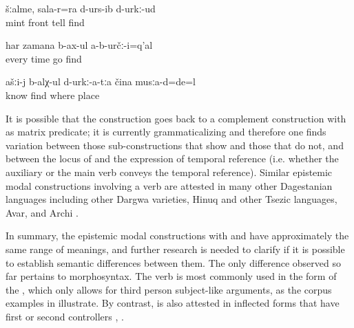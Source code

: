 \begin{exe}
	\ex	\label{ex:‎(It is made from) mint; I probably also told it (= how to make it) the last time}
	\gll	šːalme,	sala-r=ra	d-urs-ib	d-urkː-ud\\
		mint	front	tell	find\\
	\glt	{}
	
	\ex	\label{ex:‎‎Probably they did not always go (to drink milk)}
	\gll	har	zamana	b-ax-ul	a-b-určː-i=q'al\\
		every	time	go	find\\
	\glt	{}

	\ex	\label{ex:You should know / you probably know, where (in which place) they (the berries) were}
	\gll	ašːi-j	b-alχ-ul	d-urkː-a-tːa	čina	musːa-d=de=l\\
			know	find	where	place\\
	\glt	{}
\end{exe}

It is possible that the construction goes back to a complement construction with  as matrix predicate; it is currently grammaticalizing and therefore one finds variation between those sub-constructions that show  and those that do not, and between the locus of  and the expression of temporal reference (i.e. whether the auxiliary or the main verb conveys the temporal reference). Similar epistemic modal constructions involving a verb  are attested in many other Dagestanian languages including other Dargwa varieties, Hinuq and other Tsezic languages, Avar, and Archi \citep{Forker2018a, Forker2018b}.

In summary, the epistemic modal constructions with   and   have approximately the same range of meanings, and further research is needed to clarify if it is possible to establish semantic differences between them. The only difference observed so far pertains to morphosyntax. The verb  is most commonly used in the form of the , which only allows for third person subject-like arguments, as the corpus examples in  illustrate. By contrast,  is also attested in inflected forms that have first or second  controllers , .


